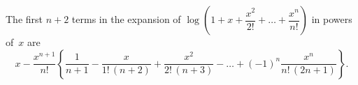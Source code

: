 The first $n + 2$ terms in the expansion of $\log\left(1 + x + \dfrac{x^{2}}{2!} + \dots + \dfrac{x^{n}}{n!}\right)$ in
powers of~$x$ are
\[
x - \frac{x^{n+1}}{n!}
  \left\{\frac{1}{n + 1}
       - \frac{x}{1!\, (n + 2)}
       + \frac{x^{2}}{2!\, (n + 3)} - \dots
       + (-1)^{n} \frac{x^{n}}{n!\, (2n + 1)}
  \right\}.
\]

